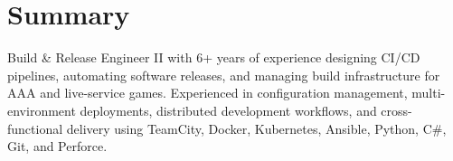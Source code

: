 \section*{Summary}
Build \& Release Engineer II with 6+ years of experience designing CI/CD pipelines, automating software releases, and managing build infrastructure for AAA and live-service games. Experienced in configuration management, multi-environment deployments, distributed development workflows, and cross-functional delivery using TeamCity, Docker, Kubernetes, Ansible, Python, C\#, Git, and Perforce.
